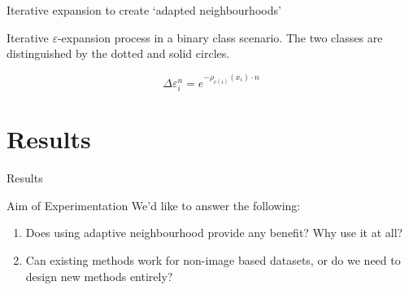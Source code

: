 \documentclass[smaller]{beamer}
\begin{document}
\begin{frame}[label={sec:org1030207}]{Iterative expansion to create `adapted neighbourhoods'}
\begin{figure}
    \centering
\label{fig:e_expansion}
\end{figure}

\begin{center}
\vspace{2em}Iterative \(\varepsilon\)-expansion process in a binary class scenario. The
two classes are distinguished by the dotted and solid circles.\vspace{1em}
\end{center}

\begin{equation*}
    \Delta\varepsilon_i^n=e^{-\rho_{c(i)}(x_i) \cdot n}
    \label{eq:step}
\end{equation*}
\end{frame}

\section{Results}
\label{sec:org95f06ef}

\begin{frame}[label={sec:orgf29c018},plain,c]{}
\begin{center}
\vspace{1em}\Huge Results
\end{center}
\end{frame}

\begin{frame}[label={sec:orgbb6578c}]{Aim of Experimentation}
We'd like to answer the following:
\begin{enumerate}
\item Does using adaptive neighbourhood provide any benefit? Why use it at all?
\item Can existing methods work for non-image based datasets, or do we need to design
new methods entirely?
\end{enumerate}
\end{frame}
\end{document}
